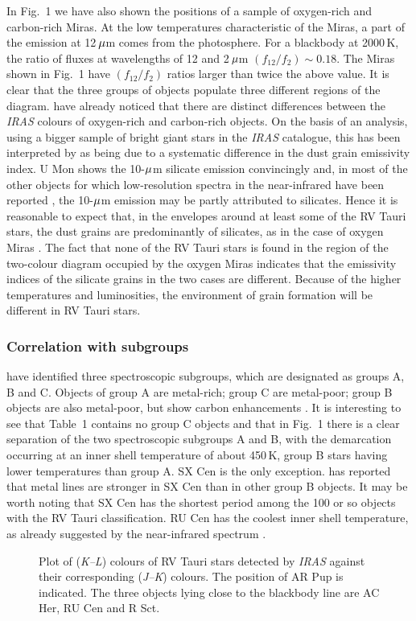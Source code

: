 \documentclass[useAMS,usenatbib]{mn2e}
\begin{document}
In Fig.~1 we have also shown the positions of a sample of
oxygen-rich and carbon-rich Miras. At the low temperatures
characteristic of the Miras, a part of the emission at 12$\,\mu$m
comes from the photosphere. For a blackbody at 2000$\,$K, the
ratio of fluxes at wavelengths of 12 and 2$\,\mu$m
$(f_{12}/f_{2})\sim 0.18$. The Miras shown in Fig.~1 have
$(f_{12}/f_{2})$ ratios larger than twice the above value. It is
clear that the three groups of objects populate three different
regions of the diagram. \citet{b10} have already noticed that
there are distinct differences between the {\it IRAS\/} colours of
oxygen-rich and carbon-rich objects. On the basis of an analysis,
using a bigger sample of bright giant stars in the {\it IRAS\/}
catalogue, this has been interpreted by \citet{b25} as being due
to a systematic difference in the dust grain emissivity index. U
Mon shows the 10-$\mu$m silicate emission convincingly and, in
most of the other objects for which low-resolution spectra in the
near-infrared have been reported \citep{b5,b19}, the 10-$\mu$m
emission may be partly attributed to silicates. Hence it is
reasonable to expect that, in the envelopes around at least some
of the RV Tauri stars, the dust grains are predominantly of
silicates, as in the case of oxygen Miras \citep{b21}. The fact
that none of the RV Tauri stars is found in the region of the
two-colour diagram occupied by the oxygen Miras indicates that the
emissivity indices of the silicate grains in the two cases are
different. Because of the higher temperatures and luminosities,
the environment of grain formation will be different in RV Tauri
stars.

\subsubsection{Correlation with subgroups}

\citet{b20} have identified three spectroscopic subgroups, which
are designated as groups A, B and C. Objects of group A are
metal-rich; group C are metal-poor; group B objects are also
metal-poor, but  show carbon enhancements \citep{b20,b14,b4,b1}.
It is interesting to see that Table~1 contains no group C objects
and that in Fig.~1 there is a clear separation of the two
spectroscopic subgroups A and B, with the demarcation  occurring
at an inner shell temperature of about 450$\,$K, group B stars
having lower temperatures than group A. SX Cen is the only
exception. \citet{b14} has reported that metal lines are stronger
in SX Cen than in other group B objects. It may be worth noting
that SX Cen has the shortest period among the 100 or so objects
with the RV Tauri classification. RU Cen has the coolest inner
shell temperature, as already suggested by the near-infrared
spectrum \citep{b6}.
\begin{figure}
  \vspace*{174pt}
  \caption{Plot of ({\it K--L\/}) colours of RV Tauri stars detected by
  {\it IRAS\/} against their corresponding ({\it J--K\/}) colours. The
  position of AR Pup is indicated. The three objects lying close to the
  blackbody line are AC Her, RU Cen and R Sct.}
\end{figure}
\end{document}
